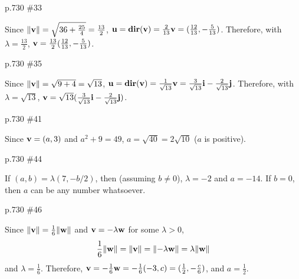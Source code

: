\begin{practice}p.730 \#33\end{practice}
\begin{pracsol}
  Since $\|\mathbf v\|=\sqrt{36+\frac{25}4}=\frac{13}2$, $\mathbf u=\operatorname{\mathbf{dir}}(\mathbf v)=\frac2{13}\mathbf v=(\frac{12}{13},-\frac{5}{13})$. Therefore, with $\lambda=\frac{13}2$, $\mathbf v=\frac{13}2(\frac{12}{13},-\frac{5}{13})$.
\end{pracsol}
\begin{practice}p.730 \#35\end{practice}
\begin{pracsol}
  Since $\|\mathbf v\|=\sqrt{9+4}=\sqrt{13}$, $\mathbf u=\operatorname{\mathbf{dir}}(\mathbf v)=\frac1{\sqrt{13}}\mathbf v=\frac3{\sqrt{13}}\mathbf i-\frac2{\sqrt{13}}\mathbf j$. Therefore, with $\lambda=\sqrt{13}$, $\mathbf v=\sqrt{13}(\frac3{\sqrt{13}}\mathbf i-\frac2{\sqrt{13}}\mathbf j)$.
\end{pracsol}
\begin{practice}p.730 \#41\end{practice}
\begin{pracsol}
  Since $\mathbf v=(a,3)$ and $a^2+9=49$, $a=\sqrt{40}=2\sqrt{10}$ ($a$ is positive).
\end{pracsol}
\begin{practice}p.730 \#44\end{practice}
\begin{pracsol}
  If $(a,b)=\lambda(7,-b/2)$, then (assuming $b\neq 0$), $\lambda=-2$ and $a=-14$. If $b=0$, then $a$ can be any number whatsoever.
\end{pracsol}
\begin{practice}p.730 \#46\end{practice}
\begin{pracsol}
  Since $\|\mathbf v\|=\frac16\|\mathbf w\|$ and $\mathbf v=-\lambda\mathbf w$ for some $\lambda>0$,
  \[\frac16\|\mathbf w\|=\|\mathbf v\|=\|{-\lambda\mathbf w}\|=\lambda\|\mathbf w\|\]
  and $\lambda=\frac16$. Therefore, $\mathbf v=-\frac16\mathbf w=-\frac16(-3,c)=(\frac12,-\frac c6)$, and $a=\frac12$.
\end{pracsol}

